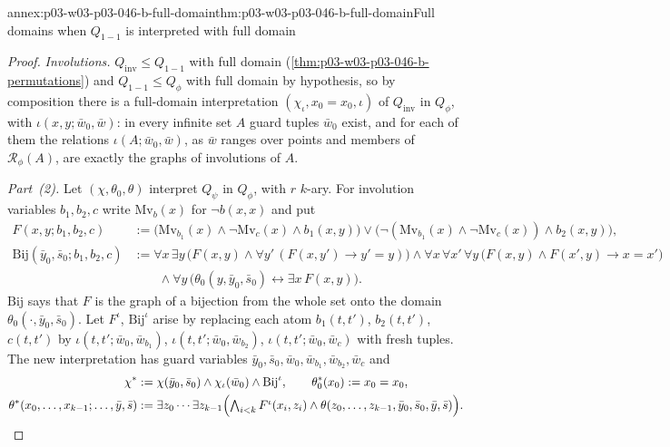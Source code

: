 \begin{annexitem}{annex:p03-w03-p03-046-b-full-domain}{thm:p03-w03-p03-046-b-full-domain}{Full domains when \(Q_{1-1}\) is interpreted with full domain}
\begin{proof}
\emph{Involutions.} \(Q_{\mathrm{inv}}\le Q_{1-1}\) with full domain
(\cref{thm:p03-w03-p03-046-b-permutations}) and \(Q_{1-1}\le Q_\phi\) with
full domain by hypothesis, so by composition there is a full-domain
interpretation \((\chi_\iota,x_0=x_0,\iota)\) of \(Q_{\mathrm{inv}}\) in
\(Q_\phi\), with \(\iota(x,y;\bar w_0,\bar w)\): in every infinite set
\(A\) guard tuples \(\bar w_0\) exist, and for each of them the relations
\(\iota(A;\bar w_0,\bar w)\), as \(\bar w\) ranges over points and members
of \(\mathscr R_\phi(A)\), are exactly the graphs of involutions of \(A\).

\emph{Part~(2).} Let \((\chi,\theta_0,\theta)\) interpret \(Q_\psi\) in
\(Q_\phi\), with \(r\) \(k\)-ary. For involution variables
\(b_1,b_2,c\) write \(\mathrm{Mv}_b(x)\) for \(\neg b(x,x)\) and put
\begin{align*}
F(x,y;b_1,b_2,c)&:=\bigl(\mathrm{Mv}_{b_1}(x)\wedge\neg\mathrm{Mv}_c(x)\wedge
b_1(x,y)\bigr)\vee\bigl(\neg(\mathrm{Mv}_{b_1}(x)\wedge\neg\mathrm{Mv}_c(x))
\wedge b_2(x,y)\bigr),\\
\mathrm{Bij}(\bar y_0,\bar s_0;b_1,b_2,c)&:=\forall x\,\exists y\,\bigl(F(x,y)
\wedge\forall y'\,(F(x,y')\to y'=y)\bigr)\wedge\forall x\,\forall x'\,\forall
y\,\bigl(F(x,y)\wedge F(x',y)\to x=x'\bigr)\\
&\qquad\wedge\forall y\,\bigl(\theta_0(y,\bar y_0,\bar s_0)\leftrightarrow
\exists x\,F(x,y)\bigr).
\end{align*}
\(\mathrm{Bij}\) says that \(F\) is the graph of a bijection from the whole
set onto the domain \(\theta_0(\cdot,\bar y_0,\bar s_0)\). Let
\(F^\iota\), \(\mathrm{Bij}^\iota\) arise by replacing each atom
\(b_1(t,t')\), \(b_2(t,t')\), \(c(t,t')\) by
\(\iota(t,t';\bar w_0,\bar w_{b_1})\), \(\iota(t,t';\bar w_0,\bar
w_{b_2})\), \(\iota(t,t';\bar w_0,\bar w_c)\) with fresh tuples. The new
interpretation has guard variables
\(\bar y_0,\bar s_0,\bar w_0,\bar w_{b_1},\bar w_{b_2},\bar w_c\) and
\begin{align*}
\chi^*&:=\chi(\bar y_0,\bar s_0)\wedge\chi_\iota(\bar w_0)\wedge
\mathrm{Bij}^\iota,\qquad\theta_0^*(x_0):=x_0=x_0,\\
\theta^*(x_0,\dots,x_{k-1};\dots,\bar y,\bar s)&:=\exists
z_0\cdots\exists z_{k-1}\Bigl(\textstyle\bigwedge_{i<k}F^\iota(x_i,z_i)\wedge
\theta(z_0,\dots,z_{k-1},\bar y_0,\bar s_0,\bar y,\bar s)\Bigr).
\end{align*}


\end{proof}
\end{annexitem}
